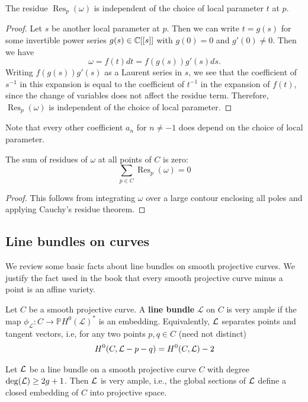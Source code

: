 \documentclass[12pt]{article}
\begin{document}
\begin{proposition}
    The residue $\operatorname{Res}_p(\omega)$ is independent of the choice of local parameter $t$ at $p$.
\end{proposition}
\begin{proof}
    Let $s$ be another local parameter at $p$. Then we can write $t = g(s)$ for some invertible power series $g(s) \in \mathbb{C}[[s]]$ with $g(0) = 0$ and $g'(0) \neq 0$. Then we have
    \[\omega = f(t) dt = f(g(s)) g'(s) ds.\]
    Writing $f(g(s)) g'(s)$ as a Laurent series in $s$, we see that the coefficient of $s^{-1}$ in this expansion is equal to the coefficient of $t^{-1}$ in the expansion of $f(t)$, since the change of variables does not affect the residue term. Therefore, $\operatorname{Res}_p(\omega)$ is independent of the choice of local parameter.
\end{proof}
Note that every other coefficient $a_n$ for $n \neq -1$ does depend on the choice of local parameter.
\begin{theorem}
    The sum of residues of $\omega$ at all points of $C$ is zero:
    \[\sum_{p \in C} \operatorname{Res}_p(\omega) = 0\]
\end{theorem}

\begin{proof}
    This follows from integrating $\omega$ over a large contour enclosing all poles and applying Cauchy's residue theorem.
\end{proof}
 
\subsection{Line bundles on curves}
We review some basic facts about line bundles on smooth projective curves. We justify the fact used in the book that every smooth projective curve minus a point is an affine variety.

\begin{definition}
    Let $C$ be a smooth projective curve. A \textbf{line bundle} $\mathcal{L}$ on $C$ is very ample if the map \(\phi_{\mathcal L}:C\to \mathbb P H^0(\mathcal L)^*\) is an embedding.
    Equivalently, ${\mathcal{L}}$ separates points and tangent vectors, i.e, for any two points $p,q \in C$ (need not distinct) \begin{align*}
        H^0(C,{\mathcal{L}} - p - q) = H^0(C,{\mathcal{L}}) - 2
    \end{align*}
\end{definition}

\begin{proposition}
    Let ${\mathcal{L}}$ be a line bundle on a smooth projective curve $C$ with degree $\deg({\mathcal{L}}) \geq 2g+1$. Then ${\mathcal{L}}$ is very ample, i.e., the global sections of ${\mathcal{L}}$ define a closed embedding of $C$ into projective space.
\end{proposition}
\end{document}
